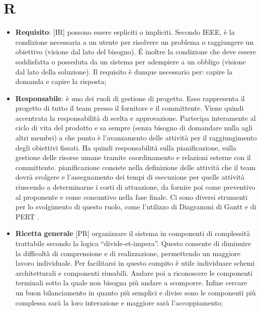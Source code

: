 %
%
%

\section{R}

\begin{itemize}
	\item \textbf{Requisito}: [IR] possono essere espliciti o impliciti. Secondo IEEE, è la condizione necessaria a un utente per risolvere un problema o raggiungere un obiettivo (visione dal lato del bisogno). \'E inoltre la condizione che deve essere soddisfatta o posseduta da un sistema per adempiere a un obbligo (visione dal lato della soluzione). \newline
	Il requisito è dunque necessario per: capire la domanda e capire la risposta;

	\item \textbf{Responsabile}: è uno dei ruoli di gestione di progetto. Esso rappresenta il progetto di tutto il team presso il fornitore e il committente. Viene quindi accentrata la responsabilità di scelta e approvazione. \newline
	Partecipa interamente al ciclo di vita del prodotto e sa sempre (senza bisogno di domandare nulla agli altri membri) a che punto è l'avanzamento delle attività per il raggiungimento degli obiettivi fissati. \newline
	Ha quindi responsabilità sulla pianificazione, sulla gestione delle risorse umane tramite coordinamento e relazioni esterne con il committente. \newline
 	pianificazione consiste nella definizione delle attività che il team dovrà svolgere e l'assegnamento dei tempi di esecuzione per quelle attività riuscendo a determinarne i costi di attuazione, da fornire poi come preventivo al proponente e come consuntivo nella fase finale. \newline
	Ci sono diversi strumenti per lo svolgimento di questo ruolo, come l'utilizzo di Diagrammi di Gantt e di PERT .

	\item \textbf{Ricetta generale} [PR] organizzare il sistema in componenti di complessità trattabile secondo la logica ``divide-et-impera''. Questo consente di diminuire la difficoltà di comprensione e di realizzazione, permettendo un maggiore lavoro individuale. Per facilitarsi in questo compito è utile individuare schemi architetturali e componenti riusabili. Andare poi a riconoscere le componenti terminali sotto la quale non bisogna più andare a scomporre. Infine cercare un buon bilanciamento in quanto più semplici e divise sono le componenti più complessa sarà la loro interazione e maggiore sarà l'accoppiamento;


\end{itemize}

